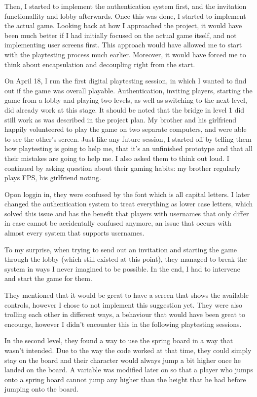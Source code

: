 \documentclass{article}
\begin{document}
Then, I started to implement the authentication system first, and the invitation functionallity and lobby afterwards. Once this was done, I started to implement the actual game. 
Looking back at how I approached the project, it would have been much better if I had initially focused on the actual game itself, and not implementing user screens first. This approach would have allowed me to start with the playtesting process much earlier. Moreover, it would have forced me to think about encapsulation and decoupling right from the start. 

\bigskip
On April 18, I run the first digital playtesting session, in which I wanted to find out if the game was overall playable. Authentication, inviting players, starting the game from a lobby and playing two levels, as well as switching to the next level, did already work at this stage. It should be noted that the bridge in level 1 did still work as was described in the project plan. My brother and his girlfriend happily volunteered to play the game on two separate computers, and were able to see the other's screen. Just like any future session, I started off by telling them how playtesting is going to help me, that it's an unfinished prototype and that all their mistakes are going to help me. I also asked them to think out loud.
I continued by asking question about their gaming habits: my brother regularly plays FPS, his girlfriend noting. 

Opon loggin in, they were confused by the font which is all capital letters. I later changed the authentication system to treat everything as lower case letters, which solved this issue and has the benefit that players with usernames that only differ in case cannot be accidentally confused anymore, an issue that occurs with almost every system that supports usernames.

To my surprise, when trying to send out an invitation and starting the game through the lobby (which still existed at this point), they managed to break the system in ways I never imagined to be possible. In the end, I had to intervene and start the game for them.

They mentioned that it would be great to have a screen that shows the available controls, however I chose to not implement this suggestion yet.
They were also trolling each other in different ways, a behaviour that would have been great to encourge, however I didn't encounter this in the following playtesting sessions.

In the second level, they found a way to use the spring board in a way that wasn't intended. Due to the way the code worked at that time, they could simply stay on the board and their character would always jump a bit higher once he landed on the board. A variable was modified later on so that a player who jumps onto a spring board cannot jump any higher than the height that he had before jumping onto the board.
\end{document}
